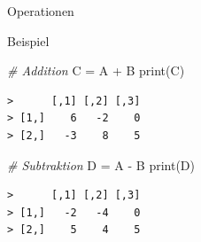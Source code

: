 \documentclass[
  8pt,
  ignorenonframetext,
]{beamer}
\newenvironment{Shaded}{\begin{snugshade}}{\end{snugshade}}
\newcommand{\CommentTok}[1]{\textcolor[rgb]{0.56,0.35,0.01}{\textit{#1}}}
\newcommand{\FunctionTok}[1]{\textcolor[rgb]{0.00,0.00,0.00}{#1}}
\newcommand{\NormalTok}[1]{#1}
\newcommand{\OtherTok}[1]{\textcolor[rgb]{0.56,0.35,0.01}{#1}}
\newcommand{\SpecialCharTok}[1]{\textcolor[rgb]{0.00,0.00,0.00}{#1}}
\begin{document}
\begin{frame}[fragile]{Operationen}
\protect\hypertarget{operationen-5}{}
\small

Beispiel \vspace{5mm}

\footnotesize

\begin{Shaded}
\begin{Highlighting}[]
\CommentTok{\# Addition}
\NormalTok{C }\OtherTok{=}\NormalTok{ A }\SpecialCharTok{+}\NormalTok{ B}
\FunctionTok{print}\NormalTok{(C)}
\end{Highlighting}
\end{Shaded}

\begin{verbatim}
>      [,1] [,2] [,3]
> [1,]    6   -2    0
> [2,]   -3    8    5
\end{verbatim}

\vspace{5mm}

\begin{Shaded}
\begin{Highlighting}[]
\CommentTok{\# Subtraktion}
\NormalTok{D }\OtherTok{=}\NormalTok{ A }\SpecialCharTok{{-}}\NormalTok{ B}
\FunctionTok{print}\NormalTok{(D)}
\end{Highlighting}
\end{Shaded}

\begin{verbatim}
>      [,1] [,2] [,3]
> [1,]   -2   -4    0
> [2,]    5    4    5
\end{verbatim}
\end{frame}
\end{document}
